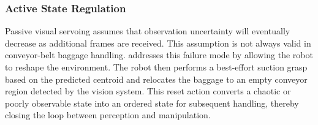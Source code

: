 \subsubsection{Active State Regulation}
Passive visual servoing assumes that observation uncertainty will eventually decrease as additional frames are received. This assumption is not always valid in conveyor-belt baggage handling.     addresses this failure mode by allowing the robot to reshape the environment. The robot then performs a best-effort suction grasp based on the predicted centroid and relocates the baggage to an empty conveyor region detected by the vision system. This reset action converts a chaotic or poorly observable state into an ordered state for subsequent handling, thereby closing the loop between perception and manipulation. 
